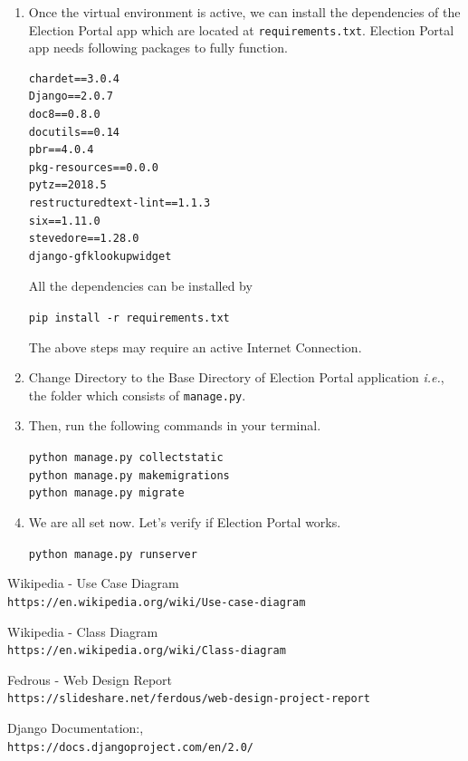 \documentclass[12pt, a4paper, titlepage]{article}
\begin{document}
\begin{appendices}
\begin{enumerate}
\item Once the virtual environment is active, we can install the dependencies of the Election Portal app which are located at \verb|requirements.txt|. Election Portal app needs following packages to fully function. 
\begin{lstlisting}
chardet==3.0.4
Django==2.0.7
doc8==0.8.0
docutils==0.14
pbr==4.0.4
pkg-resources==0.0.0
pytz==2018.5
restructuredtext-lint==1.1.3
six==1.11.0
stevedore==1.28.0
django-gfklookupwidget
\end{lstlisting}
All the dependencies can be installed by
\begin{center}
\verb|pip install -r requirements.txt|
\end{center} 
The above steps may require an active Internet Connection. 

\item Change Directory to the Base Directory of Election Portal application \textit{i.e.}, the folder which consists of \verb|manage.py|.

\item Then, run the following commands in your terminal.
\begin{center}
   \verb|python manage.py collectstatic| \\
   \verb|python manage.py makemigrations|\\
   \verb|python manage.py migrate|\\
\end{center}

\item We are all set now. Let's verify if Election Portal works.
\begin{center}
   \verb|python manage.py runserver| \\
\end{center}
\end{enumerate}  
    
\newpage
\end{appendices}




\begin{thebibliography}{9}
 
Wikipedia - Use Case Diagram
\\\texttt{https://en.wikipedia.org/wiki/Use-case-diagram}

Wikipedia - Class Diagram
\\\texttt{https://en.wikipedia.org/wiki/Class-diagram}

Fedrous - Web Design Report
\\\texttt{https://slideshare.net/ferdous/web-design-project-report}
 
Django Documentation:,
\\\texttt{https://docs.djangoproject.com/en/2.0/}
\end{thebibliography}
\end{document}
